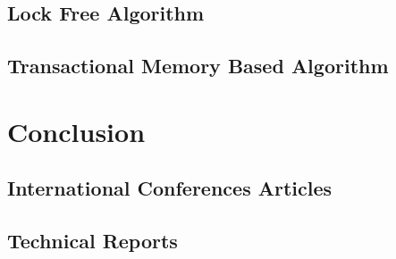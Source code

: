 \documentclass[11pt]{book}
\begin{document}
\section{Lock Free Algorithm}
\section{Transactional Memory Based Algorithm}

\chapter*{Conclusion}
%


\appendix





 \renewcommand{\bibname}{List of Publications}
 \begin{thebibliography}{9}


\section*{International Conferences Articles }




\section*{Technical Reports}




 \end{thebibliography}






\printindex
\end{document}
